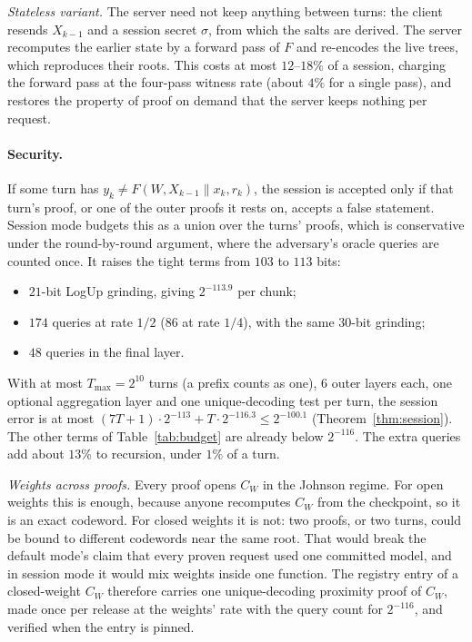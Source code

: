 \documentclass[11pt]{article}
\begin{document}
\emph{Stateless variant.} The server need not keep anything between turns: the client resends \(X_{k-1}\) and a session secret \(\sigma\), from which the salts are derived. The server recomputes the earlier state by a forward pass of \(F\) and re-encodes the live trees, which reproduces their roots. This costs at most \(12\)--\(18\%\) of a session, charging the forward pass at the four-pass witness rate (about \(4\%\) for a single pass), and restores the property of proof on demand that the server keeps nothing per request.

\paragraph{Security.}
If some turn has \(y_k \ne F(W, X_{k-1} \| x_k, r_k)\), the session is accepted only if that turn's proof, or one of the outer proofs it rests on, accepts a false statement.
Session mode budgets this as a union over the turns' proofs, which is conservative under the round-by-round argument, where the adversary's oracle queries are counted once.
It raises the tight terms from \(103\) to \(113\) bits:
\begin{itemize}
\item \(21\)-bit LogUp grinding, giving \(2^{-113.9}\) per chunk;
\item \(174\) queries at rate \(1/2\) (\(86\) at rate \(1/4\)), with the same \(30\)-bit grinding;
\item \(48\) queries in the final layer.
\end{itemize}
With at most \(T_{\max} = 2^{10}\) turns (a prefix counts as one), \(6\) outer layers each, one optional aggregation layer and one unique-decoding test per turn, the session error is at most \((7T + 1)\cdot 2^{-113} + T\cdot 2^{-116.3} \le 2^{-100.1}\) (Theorem~\ref{thm:session}).
The other terms of Table~\ref{tab:budget} are already below \(2^{-116}\).
The extra queries add about \(13\%\) to recursion, under \(1\%\) of a turn.

\emph{Weights across proofs.} Every proof opens \(C_W\) in the Johnson regime. For open weights this is enough, because anyone recomputes \(C_W\) from the checkpoint, so it is an exact codeword.
For closed weights it is not: two proofs, or two turns, could be bound to different codewords near the same root.
That would break the default mode's claim that every proven request used one committed model, and in session mode it would mix weights inside one function.
The registry entry of a closed-weight \(C_W\) therefore carries one unique-decoding proximity proof of \(C_W\), made once per release at the weights' rate with the query count for \(2^{-116}\), and verified when the entry is pinned.
\end{document}
